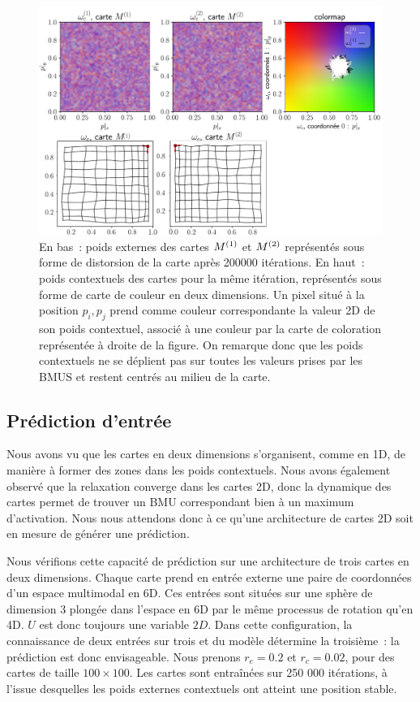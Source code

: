 \documentclass[../main]{subfiles}
\begin{document}
\begin{figure}[H]
	\centering\includegraphics[width=\textwidth]{w_cub_rc002.pdf}
	\caption{En bas~: poids externes des cartes $M^{({1})}$ et $M^{({2})}$ représentés sous forme de distorsion de la carte après 200000 itérations.
	En haut~: poids contextuels des cartes pour la même itération, représentés sous forme de carte de couleur en deux dimensions. Un pixel situé à la position $p_i,p_j$ prend comme couleur correspondante la valeur 2D de son poids contextuel, associé à une couleur par la carte de coloration représentée à droite de la figure.
	On remarque donc que les poids contextuels ne se déplient pas sur toutes les valeurs prises par les BMUS et restent centrés au milieu de la carte. \label{fig:2som_cub_wc}}

\end{figure}

\subsection{Prédiction d'entrée \label{par:pred2D}}

Nous avons vu que les cartes en deux dimensions s'organisent, comme en 1D, de manière à former des zones dans les poids contextuels.  Nous avons également observé que la relaxation converge dans les cartes 2D, donc la dynamique des cartes permet de trouver un BMU correspondant bien à un maximum d'activation.
Nous nous attendons donc à ce qu'une architecture de cartes 2D soit en mesure de générer une prédiction.

Nous vérifions cette capacité de prédiction sur une architecture de trois cartes en deux dimensions. 
Chaque carte prend en entrée externe une paire de coordonnées d'un espace multimodal en 6D. Ces entrées sont situées sur une sphère de dimension 3 plongée dans l'espace en 6D par le même processus de rotation qu'en 4D. $U$ est donc toujours une variable $2D$. 
Dans cette configuration, la connaissance de deux entrées sur trois et du modèle détermine la troisième~: la prédiction est donc envisageable.
Nous prenons $r_e = 0.2$ et $r_c = 0.02$, pour des cartes de taille $100 \times 100$. Les cartes sont entraînées sur 250 000 itérations, à l'issue desquelles les poids externes contextuels ont atteint une position stable.
\end{document}
